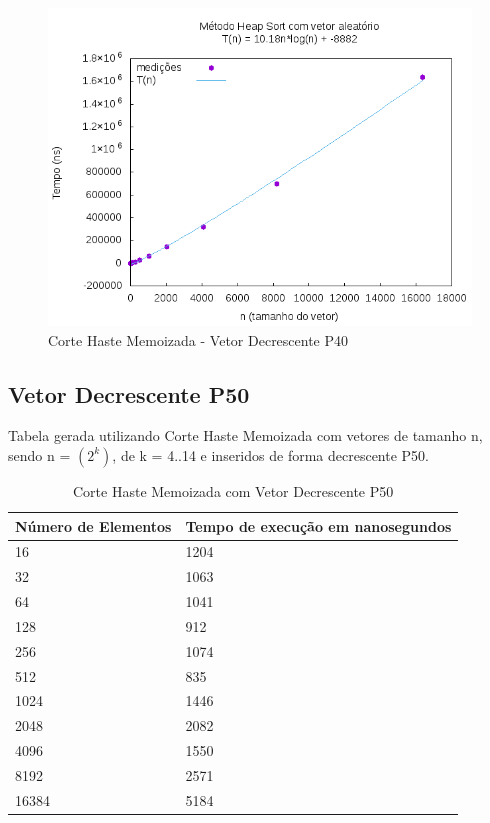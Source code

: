 \documentclass[12pt,a4paper,twoside]{report}
\begin{document}
\begin{figure}[H]
    \centering
    \includegraphics[width=0.7\linewidth]{graficos/HeapSort/vIntAleatorio/vIntAleatorio.png}
  \caption{Corte Haste Memoizada - Vetor Decrescente P40}
\end{figure}


\subsection{Vetor Decrescente P50}
Tabela gerada utilizando Corte Haste Memoizada com vetores de tamanho n, sendo n = $(2^k)$, de k = 4..14 e inseridos de forma decrescente P50.
\begin{table}[H]
\centering
\caption{Corte Haste Memoizada com Vetor Decrescente P50}
\label{my-label}
\begin{tabular}{|l|l|}
\hline
\multicolumn{1}{|c|}{\textbf{Número de Elementos}} & \multicolumn{1}{c|}{\textbf{Tempo de execução em nanosegundos}} \\ \hline
16 & 1204 \\ \hline
32 & 1063 \\ \hline
64 & 1041 \\ \hline
128 & 912 \\ \hline
256 & 1074 \\ \hline
512 & 835 \\ \hline
1024 & 1446 \\ \hline
2048 & 2082 \\ \hline
4096 & 1550 \\ \hline
8192 & 2571 \\ \hline
16384 & 5184 \\ \hline
\end{tabular}
\end{table}
\end{document}

